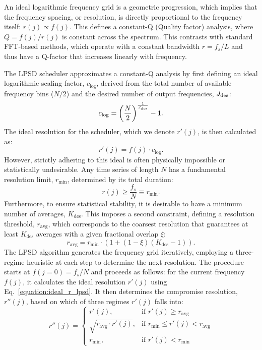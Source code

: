\documentclass[final, 5p, times, twocolumn, number, sort&compress]{elsarticle}
\begin{document}
An ideal logarithmic frequency grid is a geometric progression, which implies that the frequency spacing, or resolution, is directly proportional to the frequency itself: $r(j) \propto f(j)$. This defines a constant-Q (Quality factor) analysis, where $Q = f(j)/r(j)$ is constant across the spectrum. This contrasts with standard FFT-based methods, which operate with a constant bandwidth $r = f_s/L$ and thus have a Q-factor that increases linearly with frequency.

The LPSD scheduler approximates a constant-Q analysis by first defining an ideal logarithmic scaling factor, $c_{\log}$, derived from the total number of available frequency bins ($N/2$) and the desired number of output frequencies, $J_{\rm des}$:
\begin{equation}
    c_{\log} = \left(\frac{N}{2}\right)^{\frac{1}{J_{\rm des}}} - 1.
    \label{equation:clog}
\end{equation}
The ideal resolution for the scheduler, which we denote $r'(j)$, is then calculated as:
\begin{equation}
    r'(j) = f(j) \cdot c_{\log}.
    \label{equation:ideal_r_lpsd}
\end{equation}
However, strictly adhering to this ideal is often physically impossible or statistically undesirable. Any time series of length $N$ has a fundamental resolution limit, $r_{\min}$, determined by its total duration:
\begin{equation}
    r(j) \ge \frac{f_s}{N} \equiv r_{\min}.
\end{equation}
Furthermore, to ensure statistical stability, it is desirable to have a minimum number of averages, $K_{\text{des}}$. This imposes a second constraint, defining a resolution threshold, $r_{\text{avg}}$, which corresponds to the coarsest resolution that guarantees at least $K_{\text{des}}$ averages with a given fractional overlap $\xi$:
\begin{equation}
    r_{\text{avg}} = r_{\min} \cdot \left( 1 + (1-\xi)(K_{\text{des}}-1) \right).
\end{equation}
The LPSD algorithm generates the frequency grid iteratively, employing a three-regime heuristic at each step to determine the next resolution. The procedure starts at $f(j=0)=f_s/N$ and proceeds as follows: for the current frequency $f(j)$, it calculates the ideal resolution $r'(j)$ using Eq.~\ref{equation:ideal_r_lpsd}. It then determines the compromise resolution, $r''(j)$, based on which of three regimes $r'(j)$ falls into:
\begin{equation}
    r''(j) =
    \begin{cases}
    r'(j), & \text{if } r'(j) \geq r_{\text{avg}} \\
    \sqrt{r_{\text{avg}} \cdot r'(j)}, & \text{if } r_{\min} \leq r'(j) < r_{\text{avg}} \\
    r_{\min}, & \text{if } r'(j) < r_{\min}
    \end{cases}
    \label{eq:lpsd_heuristic}
\end{equation}
\end{document}
